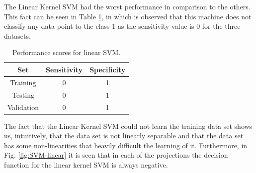 The Linear Kernel SVM had the worst performance in comparison to the others.
This fact can be seen in Table \ref{tab:linear_SVM}, in which is observed that
this machine does not classify any data point to the class 1 as the sensitivity
value is 0 for the three datasets.

\begin{table}
  \centering
  \caption{Performance scores for linear SVM.}
  \label{tab:linear_SVM}
  \begin{tabular}{ccc}
    \hline
    \textbf{Set} & \textbf{Sensitivity} & \textbf{Specificity} \\ \hline
    Training & 0 & 1 \\
    Testing & 0 & 1 \\
    Validation & 0 & 1 \\ \hline
  \end{tabular}
\end{table}

The fact that the Linear Kernel SVM could not learn the training data set shows
us, intuitively, that the data set is not linearly separable and that the data
set has some non-linearities that heavily difficult the learning of it.
Furthermore, in Fig. \ref{fig:SVM-linear} it is seen that in each of the
projections the decision function for the linear kernel SVM is always negative.

